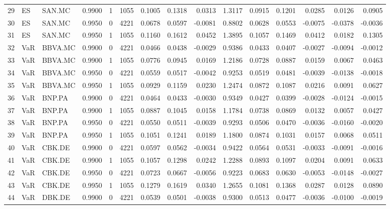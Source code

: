 \begin{table}
\begin{tabular}{lllrrrrrrrrrrrr}
29 & ES & SAN.MC & 0.9900 & 1 & 1055 & 0.1005 & 0.1318 & 0.0313 & 1.3117 & 0.0915 & 0.1201 & 0.0285 & 0.0126 & 0.0905 \\
30 & ES & SAN.MC & 0.9950 & 0 & 4221 & 0.0678 & 0.0597 & -0.0081 & 0.8802 & 0.0628 & 0.0553 & -0.0075 & -0.0378 & -0.0036 \\
31 & ES & SAN.MC & 0.9950 & 1 & 1055 & 0.1160 & 0.1612 & 0.0452 & 1.3895 & 0.1057 & 0.1469 & 0.0412 & 0.0182 & 0.1305 \\
32 & VaR & BBVA.MC & 0.9900 & 0 & 4221 & 0.0466 & 0.0438 & -0.0029 & 0.9386 & 0.0433 & 0.0407 & -0.0027 & -0.0094 & -0.0012 \\
33 & VaR & BBVA.MC & 0.9900 & 1 & 1055 & 0.0776 & 0.0945 & 0.0169 & 1.2186 & 0.0728 & 0.0887 & 0.0159 & 0.0067 & 0.0463 \\
34 & VaR & BBVA.MC & 0.9950 & 0 & 4221 & 0.0559 & 0.0517 & -0.0042 & 0.9253 & 0.0519 & 0.0481 & -0.0039 & -0.0138 & -0.0018 \\
35 & VaR & BBVA.MC & 0.9950 & 1 & 1055 & 0.0929 & 0.1159 & 0.0230 & 1.2474 & 0.0872 & 0.1087 & 0.0216 & 0.0091 & 0.0627 \\
36 & VaR & BNP.PA & 0.9900 & 0 & 4221 & 0.0464 & 0.0433 & -0.0030 & 0.9349 & 0.0427 & 0.0399 & -0.0028 & -0.0124 & -0.0015 \\
37 & VaR & BNP.PA & 0.9900 & 1 & 1055 & 0.0887 & 0.1045 & 0.0158 & 1.1784 & 0.0738 & 0.0869 & 0.0132 & 0.0057 & 0.0427 \\
38 & VaR & BNP.PA & 0.9950 & 0 & 4221 & 0.0550 & 0.0511 & -0.0039 & 0.9293 & 0.0506 & 0.0470 & -0.0036 & -0.0160 & -0.0020 \\
39 & VaR & BNP.PA & 0.9950 & 1 & 1055 & 0.1051 & 0.1241 & 0.0189 & 1.1800 & 0.0874 & 0.1031 & 0.0157 & 0.0068 & 0.0511 \\
40 & VaR & CBK.DE & 0.9900 & 0 & 4221 & 0.0597 & 0.0562 & -0.0034 & 0.9422 & 0.0564 & 0.0531 & -0.0033 & -0.0091 & -0.0016 \\
41 & VaR & CBK.DE & 0.9900 & 1 & 1055 & 0.1057 & 0.1298 & 0.0242 & 1.2288 & 0.0893 & 0.1097 & 0.0204 & 0.0091 & 0.0633 \\
42 & VaR & CBK.DE & 0.9950 & 0 & 4221 & 0.0723 & 0.0667 & -0.0056 & 0.9223 & 0.0683 & 0.0630 & -0.0053 & -0.0148 & -0.0027 \\
43 & VaR & CBK.DE & 0.9950 & 1 & 1055 & 0.1279 & 0.1619 & 0.0340 & 1.2655 & 0.1081 & 0.1368 & 0.0287 & 0.0128 & 0.0890 \\
44 & VaR & DBK.DE & 0.9900 & 0 & 4221 & 0.0539 & 0.0501 & -0.0038 & 0.9300 & 0.0513 & 0.0477 & -0.0036 & -0.0100 & -0.0019 \\

\end{tabular}
\end{table}
